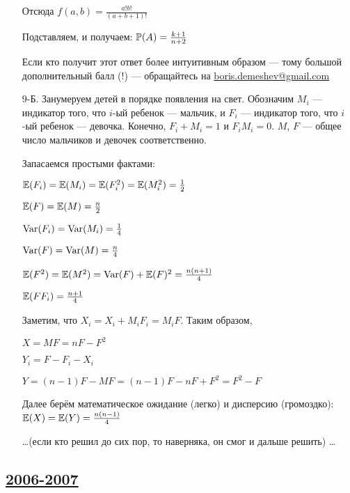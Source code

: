 \begin{enumerate}
Отсюда $f(a,b)=\frac{a!b!}{(a+b+1)!}$

Подставляем, и получаем: $\P(A)=\frac{k+1}{n+2}$

Если кто получит этот ответ более интуитивным образом — тому большой
дополнительный балл (!) — обращайтесь на \href{mailto:boris.demeshev@gmail.com}{boris.demeshev@gmail.com}

\item[9-Б.] Занумеруем детей в порядке появления на свет. Обозначим $M_{i}$ —
индикатор того, что $i$-ый ребенок — мальчик, и $F_{i}$ — индикатор того, что
$i$-ый ребенок — девочка. Конечно, $F_{i}+M_{i}=1$ и $F_{i}M_{i}=0$.
$M$, $F$ — общее число мальчиков и девочек соответственно.

Запасаемся простыми фактами:

$\E(F_{i})=\E(M_{i})=\E(F_{i}^{2})=\E(M_{i}^{2})=\frac{1}{2}$

$\E(F)=\E(M)=\frac{n}{2}$

$\Var(F_{i})=\Var(M_{i})=\frac{1}{4}$

$\Var(F)=\Var(M)=\frac{n}{4}$

$\E(F^{2})=\E(M^{2})=\Var(F)+\E(F)^{2}=\frac{n(n+1)}{4}$

$\E(FF_{i})=\frac{n+1}{4}$

Заметим, что $X_{i}=X_{i}+M_{i}F_{i}=M_{i}F$. Таким образом,

$X=MF=nF-F^{2}$

$Y_{i}=F-F_{i}-X_{i}$

$Y=(n-1)F-MF=(n-1)F-nF+F^{2}=F^{2}-F$

Далее берём математическое ожидание (легко) и дисперсию (громоздко):  $\E(X)=\E(Y)=\frac{n(n-1)}{4}$

\ldots (если кто решил до сих пор, то наверняка, он смог и дальше решить) \ldots
\end{enumerate}



\subsection[2006-2007]{\hyperref[sec:kr_02_2006_2007]{2006-2007}}
\label{sec:sol_kr_02_2006_2007}


